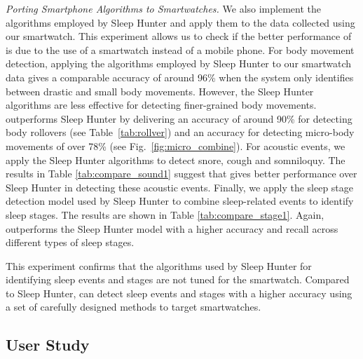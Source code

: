 \vspace{2mm} \noindent \emph{Porting Smartphone Algorithms to Smartwatches.} We also implement the algorithms employed by Sleep Hunter and
apply them to the data collected using our smartwatch. This experiment allows us to check if the better performance of {\systemname} is due
to the use of a smartwatch instead of a mobile phone. For body movement detection, applying the algorithms employed by Sleep Hunter to our
smartwatch data gives a comparable accuracy of around 96\% when the system only identifies between drastic and small body movements.
However, the Sleep Hunter algorithms are less effective for detecting finer-grained body movements.  {\systemname} outperforms Sleep Hunter
by delivering an accuracy of around 90\% for detecting body rollovers (see Table~\ref{tab:rollver}) and an accuracy for detecting
micro-body movements of over 78\% (see Fig.~\ref{fig:micro_combine}). For acoustic events, we apply the Sleep Hunter algorithms to detect
snore, cough and somniloquy. The results in Table \ref{tab:compare_sound1} suggest that {\systemname} gives better performance over Sleep
Hunter in detecting these acoustic events. Finally, we apply the sleep stage detection model used by Sleep Hunter to combine sleep-related
events to identify sleep stages. The results are shown in Table \ref{tab:compare_stage1}. Again,  {\systemname} outperforms the Sleep
Hunter model with a higher accuracy and recall across different types of sleep stages.

This experiment confirms that the algorithms used by Sleep Hunter for identifying sleep events and stages are not tuned for the smartwatch.
Compared to Sleep Hunter, {\systemname} can detect sleep events and stages with a higher accuracy using a set of carefully designed methods
to target smartwatches.


\subsection{User Study}\label{sec:user_survey}
